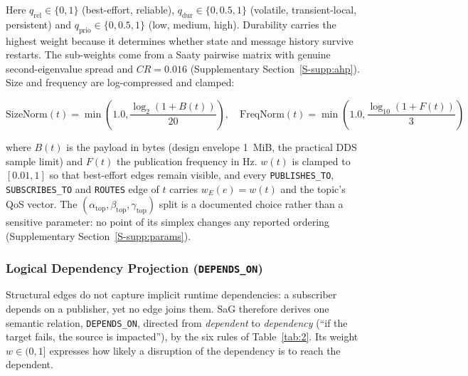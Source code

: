 \documentclass[preprint,3p]{elsarticle}
\begin{document}
Here $q_{\text{rel}} \in \{0, 1\}$ (best-effort, reliable), $q_{\text{dur}} \in \{0, 0.5, 1\}$ (volatile, transient-local, persistent) and $q_{\text{prio}} \in \{0, 0.5, 1\}$ (low, medium, high). Durability carries the highest weight because it determines whether state and message history survive restarts. The sub-weights come from a Saaty pairwise matrix with genuine second-eigenvalue spread and $CR = 0.016$ (Supplementary Section~\ref{S-supp:ahp}). Size and frequency are log-compressed and clamped:

\begin{equation}
\label{eq:sizenorm_freqnorm}
\text{SizeNorm}(t) = \min\left(1.0, \frac{\log_2(1 + B(t))}{20}\right), \quad
\text{FreqNorm}(t) = \min\left(1.0, \frac{\log_{10}(1 + F(t))}{3}\right)
\end{equation}

where $B(t)$ is the payload in bytes (design envelope 1~MiB, the practical DDS sample limit) and $F(t)$ the publication frequency in Hz. $w(t)$ is clamped to $[0.01, 1]$ so that best-effort edges remain visible, and every \texttt{PUBLISHES\_TO}, \texttt{SUBSCRIBES\_TO} and \texttt{ROUTES} edge of $t$ carries $w_E(e) = w(t)$ and the topic's QoS vector. The $(\alpha_{\text{top}}, \beta_{\text{top}}, \gamma_{\text{top}})$ split is a documented choice rather than a sensitive parameter: no point of its simplex changes any reported ordering (Supplementary Section~\ref{S-supp:params}).

\subsubsection{Logical Dependency Projection (\texttt{DEPENDS\_ON})}

Structural edges do not capture implicit runtime dependencies: a subscriber depends on a publisher, yet no edge joins them. SaG therefore derives one semantic relation, \texttt{DEPENDS\_ON}, directed from \emph{dependent} to \emph{dependency} (``if the target fails, the source is impacted''), by the six rules of Table~\ref{tab:2}. Its weight $w \in (0, 1]$ expresses how likely a disruption of the dependency is to reach the dependent.
\end{document}
